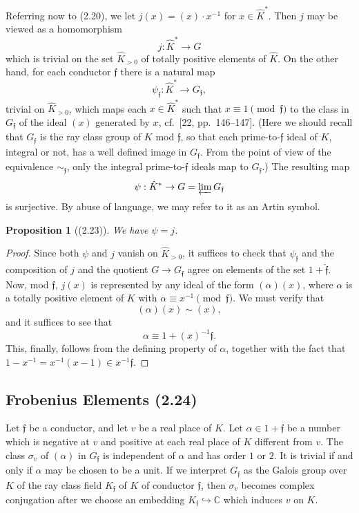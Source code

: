 \documentclass[12pt,a4paper]{article}
\theoremstyle{plain}
\newtheorem{proposition}[theorem]{Proposition}
\theoremstyle{definition}
\newcommand{\ff}{\mathfrak{f}}
\newcommand{\C}{\mathbb{C}}
\begin{document}
Referring now to (2.20), we let $j(x)=(x)\cdot x^{-1}$ for $x\in\hat{K}^*$. Then $j$ may be viewed as a homomorphism
\[
j:\hat{K}^*\to G
\]
which is trivial on the set $\hat{K}_{>0}$ of totally positive elements of $\hat{K}$. On the other hand, for each conductor $\ff$ there is a natural map
\[
\psi_{\ff}:\hat{K}^*\to G_{\ff},
\]
trivial on $\hat{K}_{>0}$, which maps each $x\in\hat{K}^*$ such that $x\equiv1\pmod{\ff}$ to the class in $G_{\ff}$ of the ideal $(x)$ generated by $x$, cf.~[22, pp.~146--147]. (Here we should recall that $G_{\ff}$ is the ray class group of $K$ mod $\ff$, so that each prime-to-$\ff$ ideal of $K$, integral or not, has a well defined image in $G_{\ff}$. From the point of view of the equivalence $\sim_{\ff}$, only the integral prime-to-$\ff$ ideals map to $G_{\ff}$.) The resulting map
\[
\psi:\hat{K}^*\to G=\varprojlim G_{\ff}
\]
is surjective. By abuse of language, we may refer to it as an Artin symbol.

\begin{proposition}[(2.23)]\label{prop:psi-j}
We have $\psi=j$.
\end{proposition}

\begin{proof}
Since both $\psi$ and $j$ vanish on $\hat{K}_{>0}$, it suffices to check that $\psi_{\ff}$ and the composition of $j$ and the quotient $G\to G_{\ff}$ agree on elements of the set $1+\hat{\ff}$. Now, mod $\ff$, $j(x)$ is represented by any ideal of the form $(\alpha)(x)$, where $\alpha$ is a totally positive element of $K$ with $\alpha\equiv x^{-1}\pmod{\ff}$. We must verify that
\[
(\alpha)(x)\sim(x),
\]
and it suffices to see that
\[
\alpha\equiv1+(x)^{-1}\ff.
\]
This, finally, follows from the defining property of $\alpha$, together with the fact that $1-x^{-1}=x^{-1}(x-1)\in x^{-1}\ff$.
\end{proof}

\subsection*{Frobenius Elements (2.24)}

Let $\ff$ be a conductor, and let $v$ be a real place of $K$. Let $\alpha\in1+\ff$ be a number which is negative at $v$ and positive at each real place of $K$ different from $v$. The class $\sigma_v$ of $(\alpha)$ in $G_{\ff}$ is independent of $\alpha$ and has order $1$ or $2$. It is trivial if and only if $\alpha$ may be chosen to be a unit. If we interpret $G_{\ff}$ as the Galois group over $K$ of the ray class field $K_{\ff}$ of $K$ of conductor $\ff$, then $\sigma_v$ becomes complex conjugation after we choose an embedding $K_{\ff}\hookrightarrow\C$ which induces $v$ on $K$.
\end{document}
